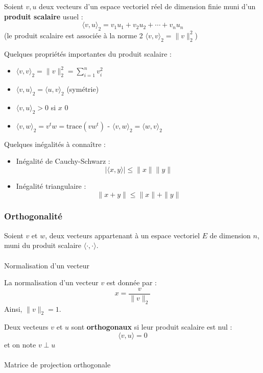 \documentclass[
  letterpaper,
  DIV=11,
  numbers=noendperiod]{scrartcl}
\makeatletter
\let\oldparagraph\paragraph
\renewcommand{\paragraph}{
    \@ifstar
      \xxxParagraphStar
      \xxxParagraphNoStar
  }
\newcommand{\xxxParagraphStar}[1]{\oldparagraph*{#1}\mbox{}}
\newcommand{\xxxParagraphNoStar}[1]{\oldparagraph{#1}\mbox{}}
\providecommand{\tightlist}{%
  \setlength{\itemsep}{0pt}\setlength{\parskip}{0pt}}\usepackage{longtable,booktabs,array}
\makeatother
\begin{document}
Soient \(v,u\) deux vecteurs d'un espace vectoriel réel de dimension
finie muni d'un \textbf{produit scalaire} usuel :
\[\langle v, u \rangle_2 = v_1 u_1 + v_2 u_2 + \cdots + v_n u_n\] (le
produit scalaire est associée à la norme 2
\(\langle v, v \rangle_2 = \|v\|_2^2\))

Quelques propriétés importantes du produit scalaire :

\begin{itemize}
\item
  \(\langle v, v \rangle_2 = \|v\|_2^2 = \sum_{i=1}^{n} v_i^2\)
\item
  \(\langle v, u \rangle_2 = \langle u, v \rangle_2\) (symétrie)
\item
  \(\langle v, u \rangle_2 > 0\) si \(x\) \ne \(0\)
\item
  \(\langle v, w \rangle_2 = v^t w = \text{trace}(vw^t)\) -
  \(\langle v, w \rangle_2 = \langle w, v \rangle_2\)
\end{itemize}

Quelques inégalités à connaître :

\begin{itemize}
\tightlist
\item
  Inégalité de Cauchy-Schwarz :
  \[|\langle x, y \rangle| \leqslant \|x\| \|y\|\]
\item
  Inégalité triangulaire : \[\|x + y\| \leqslant \|x\| + \|y\|\]
\end{itemize}

\subsubsection{Orthogonalité}\label{orthogonalituxe9}

Soient \(v\) et \(w\), deux vecteurs appartenant à un espace vectoriel
\(E\) de dimension \(n\), muni du produit scalaire
\(\langle \cdot, \cdot \rangle\).

\paragraph{Normalisation d'un vecteur}\label{normalisation-dun-vecteur}

La normalisation d'un vecteur \(v\) est donnée par : \[
x = \frac{v}{\|v\|_2}
\] Ainsi, \(\|v\|_2 = 1\).

Deux vecteurs \(v\) et \(u\) sont \textbf{orthogonaux} si leur produit
scalaire est nul : \[\langle v, u \rangle = 0\] et on note \(v \perp u\)

\paragraph{Matrice de projection
orthogonale}\label{matrice-de-projection-orthogonale}
\end{document}
